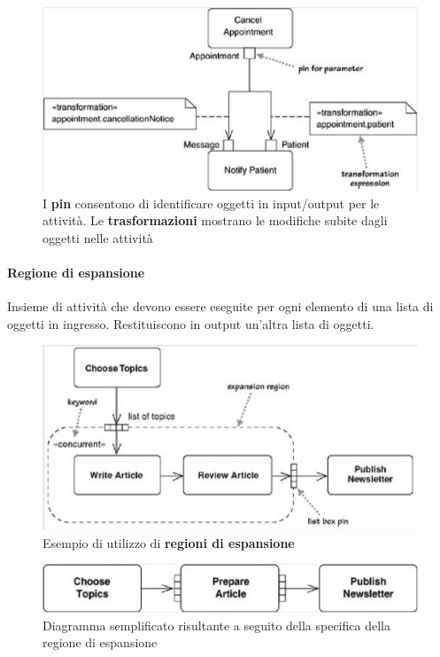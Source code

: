 \begin{figure}[H]
    \centering
    \includegraphics[width=0.75\linewidth]{assets/UML/activity/activity-7.png}
    \caption{I \textbf{pin} consentono di identificare oggetti in input/output per le attività. Le \textbf{trasformazioni} mostrano le modifiche subite dagli oggetti nelle attività}
\end{figure}

\paragraph{Regione di espansione} Insieme di attività che devono essere eseguite per ogni elemento di una lista di oggetti in ingresso. Restituiscono in output un'altra lista di oggetti.

\begin{figure}[H]
\centering
    \includegraphics[width=0.8\linewidth]{assets/UML/activity/activity-8.png}
    \caption{Esempio di utilizzo di \textbf{regioni di espansione}}
\end{figure}

\begin{figure}[H]
    \centering
    \includegraphics[width=0.8\linewidth]{assets/UML/activity/activity-9.png}
    \caption{Diagramma semplificato risultante a seguito della specifica della regione di espansione}
\end{figure}

\newpage